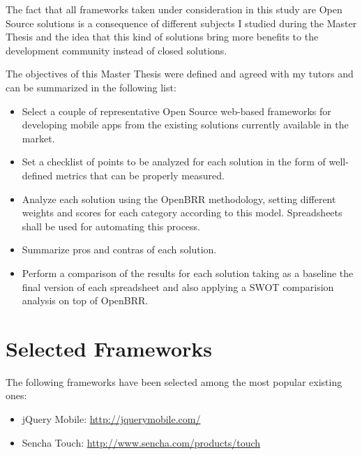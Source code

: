 \documentclass[a4paper,12pt]{book}
\begin{document}
The fact that all frameworks taken under consideration in this study are Open Source solutions is a consequence of different subjects I studied during the Master Thesis and the idea that this kind of solutions bring more benefits to the development community instead of closed solutions.


The objectives of this Master Thesis were defined and agreed with my tutors and can be summarized in the following list:

\begin{itemize}
\item Select a couple of representative Open Source web-based frameworks for developing mobile apps from the existing solutions currently available in the market.
\item Set a checklist of points to be analyzed for each solution in the form of well-defined metrics that can be properly measured.
\item Analyze each solution using the OpenBRR methodology, setting different weights and scores for each category according to this model. Spreadsheets shall be used for automating this process.
\item Summarize pros and contras of each solution.
\item Perform a comparison of the results for each solution taking as a baseline the final version of each spreadsheet and also applying a SWOT comparision analysis on top of OpenBRR.
\end{itemize}


\chapter{Selected Frameworks}
\label{chap:tech}

The following frameworks have been selected among the most popular existing ones:

\begin{itemize}
 \item jQuery Mobile: \url{http://jquerymobile.com/}
 \item Sencha Touch: \url{http://www.sencha.com/products/touch}
\end{itemize}

\end{document}
